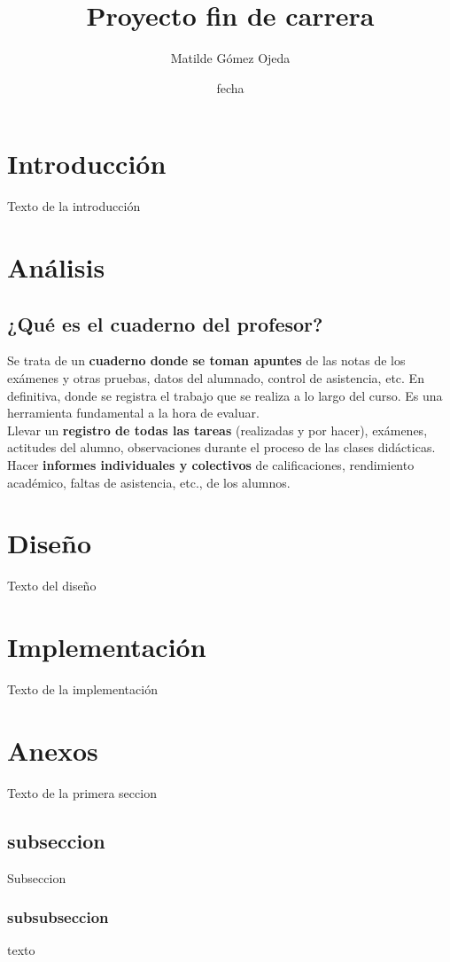 \documentclass[a4paper,12pt]{article}
\title{Proyecto fin de carrera}
\author{Matilde Gómez Ojeda}
\date {fecha}
\begin{document}
\maketitle
\tableofcontents




\begin{abstract}

\end{abstract}
\newpage



\section{Introducción}
Texto de la introducción





\newpage
\section{Análisis}


\subsection{¿Qué es el cuaderno del profesor?}
Se trata de un \textbf {cuaderno donde se toman apuntes} de las notas de los exámenes y otras pruebas, datos del alumnado, 
control de asistencia, etc. En definitiva, donde se registra el trabajo que se realiza a lo largo del curso. Es
una herramienta fundamental a la hora de evaluar.
\\Llevar un \textbf {registro de todas las tareas} (realizadas y por hacer), exámenes, actitudes del alumno, observaciones 
durante el proceso de las clases didácticas.
Hacer \textbf {informes individuales y colectivos} de calificaciones, rendimiento académico, faltas de asistencia,
etc., de los alumnos.


\newpage
\section{Diseño}
Texto del diseño

\newpage
\section{Implementación}
Texto de la implementación

\newpage
\section{Anexos}
Texto de la primera seccion

\subsection{subseccion}
Subseccion

\subsubsection{subsubseccion}
texto
\end{document}
